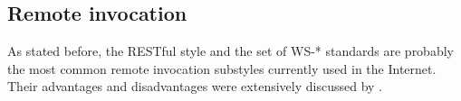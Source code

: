 \subsection{Remote invocation}
\label{sec:remote_invocation}


% 
% 


% 


As stated before, the RESTful style and the set of WS-* standards are probably the most common remote invocation substyles currently used in the Internet.
Their advantages and disadvantages were extensively discussed by \citet{pautasso_restful_2008}.

